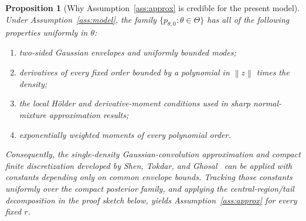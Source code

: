 \documentclass[11pt]{article}
\newtheorem{proposition}[theorem]{Proposition}
\theoremstyle{definition}
\newcommand{\norm}[1]{\left\lVert #1\right\rVert}
\begin{document}
\begin{proposition}[Why Assumption~\ref{ass:approx} is credible for the present model]
\label{prop:verify-approx}
Under Assumption~\ref{ass:model}, the family $\{p_{\theta,0}:\theta\in\Theta\}$ has all of the following properties uniformly in $\theta$:
\begin{enumerate}[label=(\roman*)]
\item two-sided Gaussian envelopes and uniformly bounded modes;
\item derivatives of every fixed order bounded by a polynomial in $\norm z$ times the density;
\item the local H\"older and derivative-moment conditions used in sharp normal-mixture approximation results;
\item exponentially weighted moments of every polynomial order.
\end{enumerate}
Consequently, the single-density Gaussian-convolution approximation and compact finite discretization developed by Shen, Tokdar, and Ghosal~\cite{shen2013} can be applied with constants depending only on common envelope bounds. Tracking those constants uniformly over the compact posterior family, and applying the central-region/tail decomposition in the proof sketch below, yields Assumption~\ref{ass:approx} for every fixed $r$.
\end{proposition}
\end{document}
